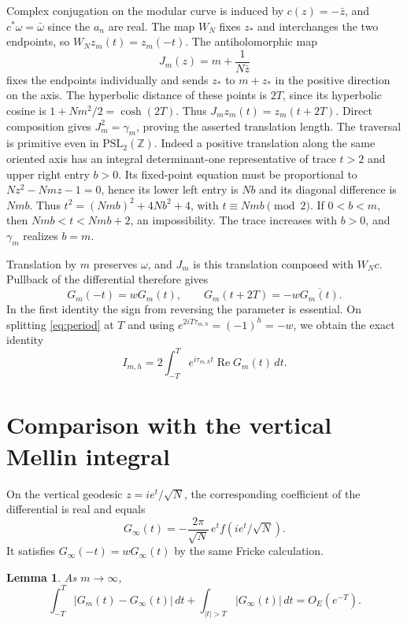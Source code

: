 \documentclass[11pt]{article}
\newtheorem{lemma}[theorem]{Lemma}
\newcommand{\Z}{\mathbb Z}
\begin{document}
Complex conjugation on the modular curve is induced by \(c(z)=-\bar z\),
and \(c^*\omega=\bar\omega\) since the \(a_n\) are real. The map \(W_N\)
fixes \(z_*\) and interchanges the two endpoints, so
\(W_N z_m(t)=z_m(-t)\). The antiholomorphic map
\[
 J_m(z)=m+\frac{1}{N\bar z}
\]
fixes the endpoints individually and sends \(z_*\) to \(m+z_*\) in the
positive direction on the axis. The hyperbolic distance of these points is
\(2T\), since its hyperbolic cosine is \(1+Nm^2/2=\cosh(2T)\).
Thus \(J_m z_m(t)=z_m(t+2T)\). Direct composition gives
\(J_m^2=\gamma_m\), proving the asserted translation length.
The traversal is primitive even in \(\mathrm{PSL}_2(\Z)\). Indeed a
positive translation along the same oriented axis has an integral determinant-one
representative of trace \(t>2\) and upper right entry \(b>0\). Its fixed-point
equation must be proportional to \(Nz^2-Nmz-1=0\), hence its lower left entry
is \(Nb\) and its diagonal difference is \(Nmb\). Thus
\(t^2=(Nmb)^2+4Nb^2+4\), with \(t\equiv Nmb\pmod 2\). If \(0<b<m\),
then \(Nmb<t<Nmb+2\), an impossibility. The trace increases with \(b>0\),
and \(\gamma_m\) realizes \(b=m\).

Translation by \(m\) preserves \(\omega\), and \(J_m\) is this translation
composed with \(W_N c\). Pullback of the differential therefore gives
\begin{equation}
 G_m(-t)=wG_m(t),\qquad
 G_m(t+2T)=-w\overline{G_m(t)}.
 \label{eq:symmetries}
\end{equation}
In the first identity the sign from reversing the parameter is essential.
On splitting \eqref{eq:period} at \(T\) and using
\(e^{2iT\tau_{m,h}}=(-1)^h=-w\), we obtain the exact identity
\begin{equation}
 I_{m,h}=2\int_{-T}^T e^{i\tau_{m,h}t}\operatorname{Re}G_m(t)\,dt .
 \label{eq:half}
\end{equation}

\section{Comparison with the vertical Mellin integral}

On the vertical geodesic \(z=i e^t/\sqrt N\), the corresponding coefficient
of the differential is real and equals
\[
 G_\infty(t)=-\frac{2\pi}{\sqrt N}\,e^t f(i e^t/\sqrt N).
\]
It satisfies \(G_\infty(-t)=wG_\infty(t)\) by the same Fricke calculation.

\begin{lemma}\label{lem:error}
As \(m\to\infty\),
\[
 \int_{-T}^{T}|G_m(t)-G_\infty(t)|\,dt+
 \int_{|t|>T}|G_\infty(t)|\,dt=O_E(e^{-T}).
\]
\end{lemma}
\end{document}
